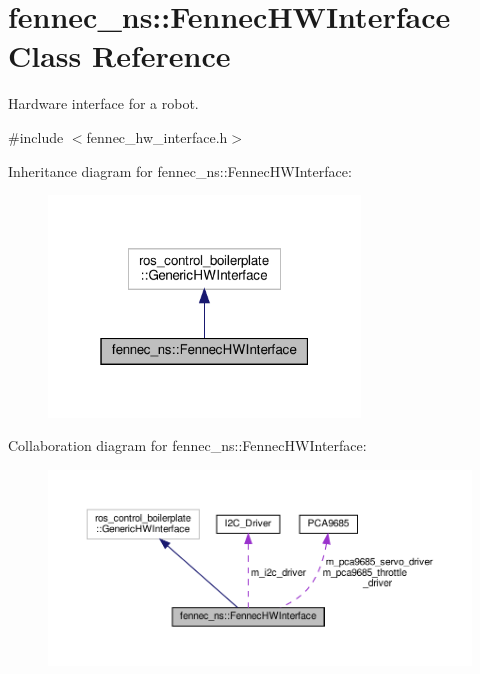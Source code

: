 \hypertarget{classfennec__ns_1_1_fennec_h_w_interface}{}\section{fennec\+\_\+ns\+:\+:Fennec\+H\+W\+Interface Class Reference}
\label{classfennec__ns_1_1_fennec_h_w_interface}


Hardware interface for a robot.  




{\ttfamily \#include $<$fennec\+\_\+hw\+\_\+interface.\+h$>$}



Inheritance diagram for fennec\+\_\+ns\+:\+:Fennec\+H\+W\+Interface\+:
\nopagebreak
\begin{figure}[H]
\begin{center}
\leavevmode
\includegraphics[width=235pt]{classfennec__ns_1_1_fennec_h_w_interface__inherit__graph}
\end{center}
\end{figure}


Collaboration diagram for fennec\+\_\+ns\+:\+:Fennec\+H\+W\+Interface\+:
\nopagebreak
\begin{figure}[H]
\begin{center}
\leavevmode
\includegraphics[width=350pt]{classfennec__ns_1_1_fennec_h_w_interface__coll__graph}
\end{center}
\end{figure}
